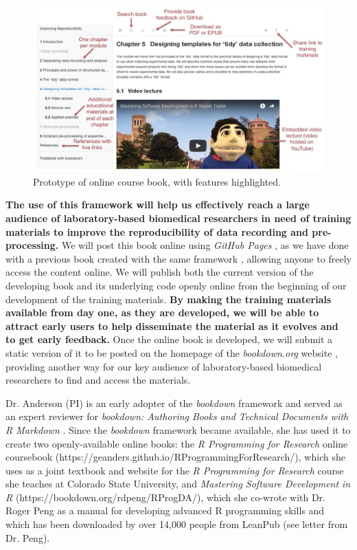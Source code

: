 \documentclass[pdftex,english,11.5pt,parskip=half]{scrartcl}
\begin{document}
\begin{figure}[t] \includegraphics[width =
\textwidth]{figures/book_prototype.jpg} \caption{Prototype of online course
book, with features highlighted.} \label{fig:prototype} \end{figure}

\textbf{The use of this framework will help us effectively reach a large
audience of laboratory-based biomedical researchers in need of training materials to improve the reproducibility of data
recording and pre-processing.} We will 
post this book online using \textit{GitHub Pages} \cite{gitpages}, as we have done
with a previous book created with the same framework \cite{andersoncoursebook}, allowing anyone to
freely access the content online. We will publish both the current version of the developing book and its underlying code openly online from the beginning
of our development of the training materials. \textbf{By making the training
materials available from day one, as they are developed, we will be able to
attract early users to help disseminate the material as it evolves and to get early feedback.} Once the online
book is developed, we will submit a static version of it to be posted
on the homepage of the \textit{bookdown.org} website \cite{bookdownorg}, providing
another way for our key audience of laboratory-based biomedical researchers to find and access the materials.

Dr. Anderson (PI) is an early adopter of the \textit{bookdown} framework and served as an expert reviewer for \textit{bookdown: Authoring Books
and Technical Documents with R Markdown} \cite{xie2016bookdown}. Since
the \textit{bookdown} framework became available, she has used it to create two openly-available online
books: the \textit{R Programming for Research} online coursebook (https://geanders.github.io/RProgrammingForResearch/), which she uses
as a joint textbook and website for the \textit{R Programming for Research}
course she teaches at Colorado State University, and \textit{Mastering
Software Development in R} (https://bookdown.org/rdpeng/RProgDA/), which she co-wrote with Dr. Roger Peng as a manual
for developing advanced R programming skills and which has been downloaded by
over 14,000 people from LeanPub (see letter from Dr. Peng). 
\end{document}
